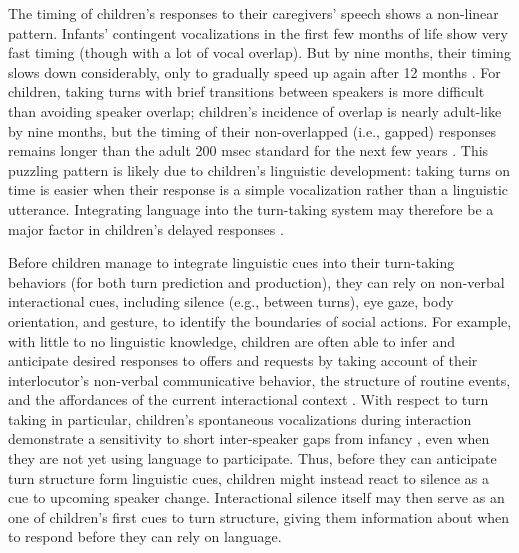 \documentclass[authoryear, 12pt]{elsarticle}
\begin{document}

The timing of children's responses to their caregivers' speech shows a non-linear pattern. Infants' contingent vocalizations in the first few months of life show very fast timing (though with a lot of vocal overlap). But by nine months, their timing slows down considerably, only to gradually speed up again after 12 months \citep{hilbrink2015}. For children, taking turns with brief transitions between speakers is more difficult than avoiding speaker overlap; children's incidence of overlap is nearly adult-like by nine months, but the timing of their non-overlapped (i.e., gapped) responses remains longer than the adult 200 msec standard for the next few years \citep{casillas2016, garvey1984, garvey1981, ervin-tripp1979}. This puzzling pattern is likely due to children's linguistic development: taking turns on time is easier when their response is a simple vocalization rather than a linguistic utterance. Integrating language into the turn-taking system may therefore be a major factor in children's delayed responses \citep{casillas2016}.

Before children manage to integrate linguistic cues into their turn-taking behaviors (for both turn prediction and production), they can rely on non-verbal interactional cues, including silence (e.g., between turns), eye gaze, body orientation, and gesture, to identify the boundaries of social actions. For example, with little to no linguistic knowledge, children are often able to infer and anticipate desired responses to offers and requests by taking account of their interlocutor's non-verbal communicative behavior, the structure of routine events, and the affordances of the current interactional context \citep{reddy13, nomikou11, shatz78}. With respect to turn taking in particular, children's spontaneous vocalizations during interaction demonstrate a sensitivity to short inter-speaker gaps from infancy \citep{hilbrink2015}, even when they are not yet using language to participate. Thus, before they can anticipate turn structure form linguistic cues, children might instead react to silence as a cue to upcoming speaker change. Interactional silence itself may then serve as an one of children's first cues to turn structure, giving them information about when to respond before they can rely on language.
\end{document}
